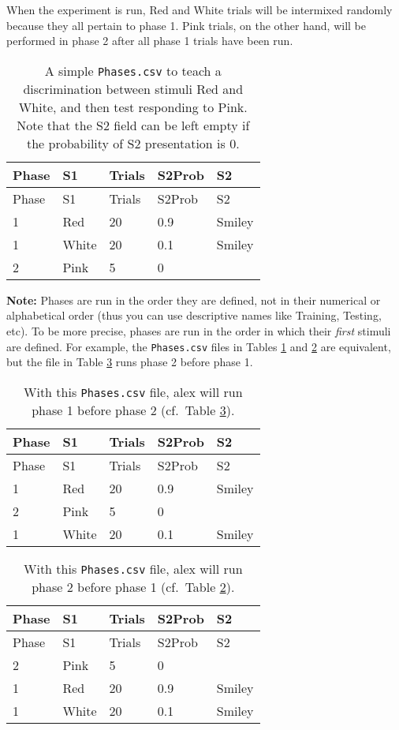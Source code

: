 \documentclass[11pt,]{article}
\begin{document}
When the experiment is run, Red and White trials will be intermixed
randomly because they all pertain to phase 1. Pink trials, on the other
hand, will be performed in phase 2 after all phase 1 trials have been
run.

\begin{longtable}[c]{@{}lllll@{}}
\caption{A simple \texttt{Phases.csv} to teach a discrimination between
stimuli Red and White, and then test responding to Pink. Note that the
S2 field can be left empty if the probability of S2 presentation is 0.
\label{phases}}\tabularnewline
\toprule
Phase & S1 & Trials & S2Prob & S2\tabularnewline
\midrule
\endfirsthead
\toprule
Phase & S1 & Trials & S2Prob & S2\tabularnewline
\midrule
\endhead
1 & Red & 20 & 0.9 & Smiley\tabularnewline
1 & White & 20 & 0.1 & Smiley\tabularnewline
2 & Pink & 5 & 0 &\tabularnewline
\bottomrule
\end{longtable}

\pagebreak

\textbf{Note:} Phases are run in the order they are defined, not in
their numerical or alphabetical order (thus you can use descriptive
names like Training, Testing, etc). To be more precise, phases are run
in the order in which their \emph{first} stimuli are defined. For
example, the \texttt{Phases.csv} files in Tables \ref{phases} and
\ref{phases-order1} are equivalent, but the file in Table
\ref{phases-order2} runs phase 2 before phase 1.

\begin{longtable}[c]{@{}lllll@{}}
\caption{With this \texttt{Phases.csv} file, alex will run phase 1
before phase 2 (cf.~Table \ref{phases-order2}).
\label{phases-order1}}\tabularnewline
\toprule
Phase & S1 & Trials & S2Prob & S2\tabularnewline
\midrule
\endfirsthead
\toprule
Phase & S1 & Trials & S2Prob & S2\tabularnewline
\midrule
\endhead
1 & Red & 20 & 0.9 & Smiley\tabularnewline
2 & Pink & 5 & 0 &\tabularnewline
1 & White & 20 & 0.1 & Smiley\tabularnewline
\bottomrule
\end{longtable}

\begin{longtable}[c]{@{}lllll@{}}
\caption{With this \texttt{Phases.csv} file, alex will run phase 2
before phase 1 (cf.~Table \ref{phases-order1}).
\label{phases-order2}}\tabularnewline
\toprule
Phase & S1 & Trials & S2Prob & S2\tabularnewline
\midrule
\endfirsthead
\toprule
Phase & S1 & Trials & S2Prob & S2\tabularnewline
\midrule
\endhead
2 & Pink & 5 & 0 &\tabularnewline
1 & Red & 20 & 0.9 & Smiley\tabularnewline
1 & White & 20 & 0.1 & Smiley\tabularnewline
\bottomrule
\end{longtable}
\end{document}
